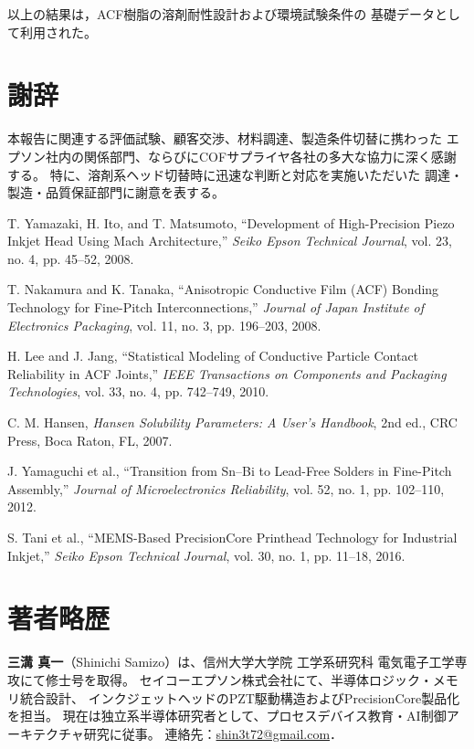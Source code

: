 \documentclass[conference]{IEEEtran}
\begin{document}
以上の結果は，ACF樹脂の溶剤耐性設計および環境試験条件の
基礎データとして利用された。

\section*{謝辞}

本報告に関連する評価試験、顧客交渉、材料調達、製造条件切替に携わった  
エプソン社内の関係部門、ならびにCOFサプライヤ各社の多大な協力に深く感謝する。  
特に、溶剤系ヘッド切替時に迅速な判断と対応を実施いただいた  
調達・製造・品質保証部門に謝意を表する。

\begin{thebibliography}{99}

T. Yamazaki, H. Ito, and T. Matsumoto,
``Development of High-Precision Piezo Inkjet Head Using Mach Architecture,''
\textit{Seiko Epson Technical Journal}, vol. 23, no. 4, pp. 45–52, 2008.

T. Nakamura and K. Tanaka,
``Anisotropic Conductive Film (ACF) Bonding Technology for Fine-Pitch Interconnections,''
\textit{Journal of Japan Institute of Electronics Packaging}, vol. 11, no. 3, pp. 196–203, 2008.

H. Lee and J. Jang,
``Statistical Modeling of Conductive Particle Contact Reliability in ACF Joints,''
\textit{IEEE Transactions on Components and Packaging Technologies}, vol. 33, no. 4, pp. 742–749, 2010.

C. M. Hansen,
\textit{Hansen Solubility Parameters: A User’s Handbook}, 2nd ed.,
CRC Press, Boca Raton, FL, 2007.

J. Yamaguchi et al.,
``Transition from Sn–Bi to Lead-Free Solders in Fine-Pitch Assembly,''
\textit{Journal of Microelectronics Reliability}, vol. 52, no. 1, pp. 102–110, 2012.

S. Tani et al.,
``MEMS-Based PrecisionCore Printhead Technology for Industrial Inkjet,'' 
\textit{Seiko Epson Technical Journal}, vol. 30, no. 1, pp. 11–18, 2016.

\end{thebibliography}

\section*{著者略歴}

\textbf{三溝 真一}（Shinichi Samizo）は、信州大学大学院 工学系研究科 電気電子工学専攻にて修士号を取得。  
セイコーエプソン株式会社にて、半導体ロジック・メモリ統合設計、  
インクジェットヘッドのPZT駆動構造およびPrecisionCore製品化を担当。  
現在は独立系半導体研究者として、プロセスデバイス教育・AI制御アーキテクチャ研究に従事。  
連絡先：\href{mailto:shin3t72@gmail.com}{shin3t72@gmail.com}．

\balance %
\end{document}
